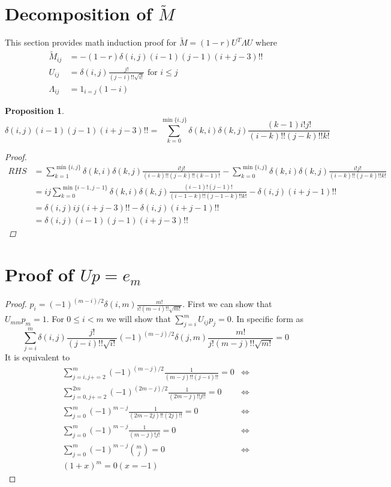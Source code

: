 \documentclass{article}
\newtheorem{proposition}{Proposition}
\begin{document}
\section{Decomposition of $\widetilde{M}$}
This section provides math induction proof for
$\widetilde{M}= (1-r) U^T \Lambda U$ where
\begin{align}
\widetilde{M}_{ij} & = -(1-r)\delta(i, j) (i-1)(j-1) (i+j-3)!! \\
U_{ij} & = \delta(i, j) \frac{j!}{(j-i)!!\sqrt{i!}} \textrm{ for } i\leq j \\
\Lambda_{ij} & = 1_{i = j} (1-i)
\end{align}
\begin{proposition}\label{prop:UUM}
\begin{equation}
\delta(i, j)(i-1)(j-1)(i+j-3)!! = \sum_{k=0}^{\min\{i, j\}}
\delta(k, i) \delta(k, j) \frac{(k-1)i!j!}{(i-k)!!(j-k)!!k!}
\end{equation}
\begin{proof}
\begin{align*}
RHS & =
\sum_{k=1}^{\min\{i, j\}}
\delta(k, i) \delta(k, j) \frac{i!j!}{(i-k)!!(j-k)!!(k-1)!}
-  \sum_{k=0}^{\min\{i, j\}}
\delta(k, i) \delta(k, j) \frac{i!j!}{(i-k)!!(j-k)!!k!} \\
& = ij\sum_{k=0}^{\min\{i-1, j-1\}}
\delta(k, i) \delta(k, j) \frac{(i-1)!(j-1)!}{(i-1-k)!!(j-1-k)!!k!} -
\delta(i, j)(i+j-1)!! \\
& =  \delta(i, j)ij(i+j-3)!! - \delta(i, j)(i+j-1)!!\\
& = \delta(i, j)(i-1)(j-1)(i+j-3)!!
\end{align*}
\end{proof}
\end{proposition}
\section{Proof of $Up=e_m$}
\begin{proof}
$p_i = (-1)^{(m-i)/2}\delta(i, m) \frac{m!}{i!(m-i)!! \sqrt{m!}} $.
First we can show that $U_{mm} p_m = 1 $. For $ 0\leq i < m $ we
will show that $ \sum_{j=i}^m U_{ij} p_j = 0 $. In specific form as
\begin{equation}
\sum_{j=i}^m \delta(i, j) \frac{j!}{(j-i)!!\sqrt{i!}}
(-1)^{(m-j)/2}\delta(j, m) \frac{m!}{j!(m-j)!! \sqrt{m!}} = 0
\end{equation}
It is equivalent to
\begin{align*}
\sum_{j=i, j+=2}^m (-1)^{(m-j)/2} \frac{1}{(m-j)!!(j-i)!!}  = 0 & \iff \\
\sum_{j=0, j+=2}^{2m} (-1)^{(2m-j)/2} \frac{1}{(2m-j)!! j!!} = 0 & \iff \\
\sum_{j=0}^{m} (-1)^{m-j} \frac{1}{(2m-2j)!! (2j)!!} = 0 & \iff \\
\sum_{j=0}^{m} (-1)^{m-j} \frac{1}{(m-j)! j!} = 0 & \iff \\
\sum_{j=0}^{m} (-1)^{m-j} \binom{m}{j} = 0 & \iff \\
(1+x)^m = 0 (x=-1)
\end{align*}
\end{proof}
\end{document}

